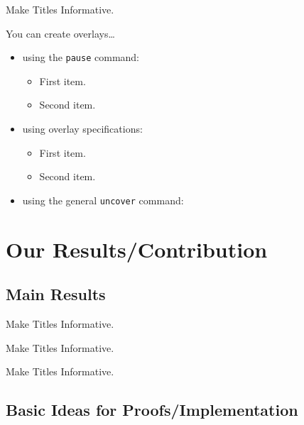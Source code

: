 \documentclass{beamer}
\begin{document}
\begin{frame}{Make Titles Informative.}

  You can create overlays\dots
  \begin{itemize}
  \item using the \texttt{pause} command:
    \begin{itemize}
    \item
      First item.
      \pause
    \item    
      Second item.
    \end{itemize}
  \item
    using overlay specifications:
    \begin{itemize}
    \item<3->
      First item.
    \item<4->
      Second item.
    \end{itemize}
  \item
    using the general \texttt{uncover} command:
    \begin{itemize}
    \end{itemize}
  \end{itemize}
\end{frame}



\section{Our Results/Contribution}

\subsection{Main Results}

\begin{frame}{Make Titles Informative.}
\end{frame}

\begin{frame}{Make Titles Informative.}
\end{frame}

\begin{frame}{Make Titles Informative.}
\end{frame}


\subsection{Basic Ideas for Proofs/Implementation}
\end{document}
